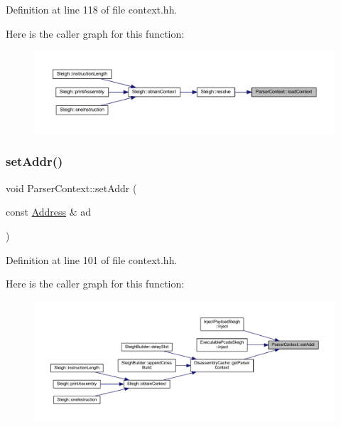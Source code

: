 Definition at line 118 of file context.\+hh.

Here is the caller graph for this function\+:
\nopagebreak
\begin{figure}[H]
\begin{center}
\leavevmode
\includegraphics[width=350pt]{class_parser_context_af07fe028f5e411bdb414b1683bd4c3b6_icgraph}
\end{center}
\end{figure}
\mbox{\label{class_parser_context_a2806900c8b222d21f106031876b72e8e}} 
\subsubsection{\texorpdfstring{setAddr()}{setAddr()}}
{\footnotesize\ttfamily void Parser\+Context\+::set\+Addr (\begin{DoxyParamCaption}\item[{const \mbox{\hyperlink{class_address}{Address}} \&}]{ad }\end{DoxyParamCaption})\hspace{0.3cm}{\ttfamily [inline]}}



Definition at line 101 of file context.\+hh.

Here is the caller graph for this function\+:
\nopagebreak
\begin{figure}[H]
\begin{center}
\leavevmode
\includegraphics[width=350pt]{class_parser_context_a2806900c8b222d21f106031876b72e8e_icgraph}
\end{center}
\end{figure}
\mbox{\label{class_parser_context_a804dc3663f33ae4a4ffb7278e7225546}} 
